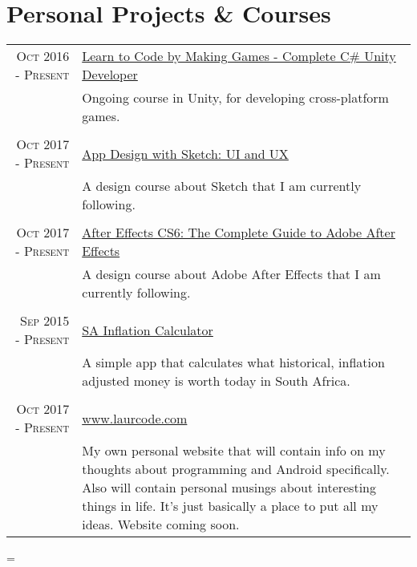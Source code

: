 \documentclass[a4paper,10pt,notitlepage]{article}
\newenvironment{absolutelynopagebreak}
  {\par\nobreak\vfil\penalty0\vfilneg
   \vtop\bgroup}
  {\par\xdef\tpd{\the\prevdepth}\egroup
   \prevdepth=\tpd}
\begin{document}
\begin{absolutelynopagebreak}

\addtolength{\voffset}{-1.8cm} %

\section{Personal Projects \& Courses}
\begin{tabular}{r|p{11cm}}

\textsc{Oct 2016 - Present} & \href{https://www.udemy.com/unitycourse/learn/v4/}{Learn to Code by Making Games - Complete C\# Unity Developer} \\&\footnotesize{Ongoing course in Unity, for developing cross-platform games.} \\

\multicolumn{2}{c}{}\\
\textsc{Oct 2017 - Present} &
\href{https://www.udemy.com/app-design-with-sketch-ui-and-ux/}{App Design with Sketch: UI and UX}\\&\footnotesize{A design course about Sketch that I am currently following.} \\

\multicolumn{2}{c}{}\\
\textsc{Oct 2017 - Present} &
\href{https://www.udemy.com/aftereffects/}{After Effects CS6: The Complete Guide to Adobe After Effects}\\&\footnotesize{A design course about Adobe After Effects that I am currently following.} \\

\multicolumn{2}{c}{}\\
\textsc{Sep 2015 - Present} &
\href{https://play.google.com/store/apps/details?id=za.co.inflationcalc}{SA Inflation Calculator}\\&\footnotesize{A simple app that calculates what historical, inflation adjusted money is worth today in South Africa.} \\

\multicolumn{2}{c}{}\\
\textsc{Oct 2017 - Present} &
\href{www.laurcode.com}{www.laurcode.com}\\&\footnotesize{My own personal website that will contain info on my thoughts about programming and Android specifically. Also will contain personal musings about interesting things in life. It's just basically a place to put all my ideas. Website coming soon.} \\


\end{tabular}
\end{absolutelynopagebreak}
\end{document}
